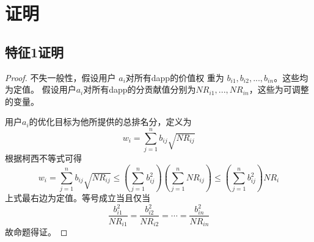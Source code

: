 \section{证明}
\subsection{特征1证明}
\begin{proof}

不失一般性，假设用户 $a_i$对所有dapp的价值权
重为 $b_{i1}, b_{i2}, ..., b_{in}$。这些均为定值。
假设用户$a_i$对所有dapp的分贡献值分别为$NR_{i1},...,NR_{in}$，这些为可调整的变量。

用户$a_i$的优化目标为他所提供的总排名分，定义为
$$w_i = \sum_{j=1}^n b_{ij}\sqrt{NR_{ij}}$$
根据柯西不等式可得
$$w_i = \sum_{j=1}^n b_{ij}\sqrt{NR_{ij}} \leq (\sum_{j=1}^n b_{ij}^2)(\sum_{j=1}^n NR_{ij}) \leq (\sum_{j=1}^n b_{ij}^2)NR_i$$
上式最右边为定值。等号成立当且仅当
$$\frac{b_{i1}^2}{NR_{i1}}=\frac{b_{i2}^2}{NR_{i2}}=\cdots=\frac{b_{in}^2}{NR_{in}}$$
故命题得证。

\end{proof}
